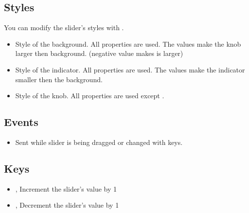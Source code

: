 \documentclass[letterpaper,10pt,english]{sphinxmanual}
\begin{document}
\subsection{Styles}
\label{\detokenize{object-types/slider:styles}}
You can modify the slider’s styles with .
\begin{itemize}
\item {} 
 Style of the background. All  properties are used. The  values make the knob larger then background. (negative value makes is larger)

\item {} 
 Style of the indicator. All  properties are used. The  values make the indicator smaller then the background.

\item {} 
 Style of the knob.  All  properties are used except .

\end{itemize}


\subsection{Events}
\label{\detokenize{object-types/slider:events}}\begin{itemize}
\item {} 
 Sent while slider is being dragged or changed with keys.

\end{itemize}


\subsection{Keys}
\label{\detokenize{object-types/slider:keys}}\begin{itemize}
\item {} 
,  Increment the slider’s value by 1

\item {} 
,  Decrement the slider’s value by 1

\end{itemize}
\end{document}
